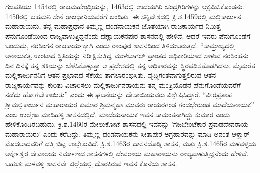 ಗಜಪತಿಯು 1454ರಲ್ಲಿ ರಾಜಮಹೇಂದ್ರಿಯನ್ನು, 1463ರಲ್ಲಿ ಉದಯಗಿರಿ ಚಂದ್ರಗಿರಿಗಳನ್ನು ಆಕ್ರಮಿಸಿಕೊಂಡನು. 1450ರಲ್ಲಿ ಬಹಮನಿ ಸೇನೆ ರಾಜಧಾನಿಯವರೆಗೆ ಬಂದಿತು. ಈ ಸನ್ನಿವೇಶದಲ್ಲಿ ಕ್ರಿ.ಶ.1459ರಲ್ಲಿ ಮಲ್ಲಿಕಾರ್ಜುನ ಮಹಾರಾಯನು, ತನ್ನ ಮಹಾಪ್ರಧಾನ ತಿಮ್ಮಣ್ಣ ದಂಡನಾಯಕನ ಜೊತೆಯಾಗಿ ರಾಜಕಾರ್ಯದ ನಿಮಿತ್ತ ಪೆನುಗೊಂಡೆಯಿಂದ ರಾಜ್ಯವಾಳುತ್ತಿದ್ದನೆಂದು ದಣ್ಣಾಯಕನಪುರ ಶಾಸನದಲ್ಲಿ ಹೇಳಿದೆ. ಆದರೆ ಇವರು ಪೆನುಗೊಂಡೆಗೆ ಬಂದುದು, ನರಸಿಂಗನ ರಾಜಕಾರ್ಯಕ್ಕಾಗಿ ಎಂದು ರಾಂಪುರ ಶಾಸನದಿಂದ ತಿಳಿದುಬರುತ್ತದೆ. “ಸಾಮ್ರಾಜ್ಯದಲ್ಲಿ ಅನಾಯಕತ್ವ ಉಂಟಾದ ಸ್ಥಿತಿಯನ್ನು ನಿರೀಕ್ಷಿಸುತ್ತಿದ್ದ ಮುಳಬಾಗಲ್​ ಪ್ರಾಂತದ ಅಧಿಕಾರಿಯಾದ ಸಾಳುವ ನರಸಿಂಹನು ದಿನ ದಿನಕ್ಕೆ ತನ್ನ ಶಕ್ತಿಯನ್ನು ಬೆಳೆಸಿಕೊಳ್ಳುತ್ತಾ ಆ ಪ್ರದೇಶದಲ್ಲಿ ತನ್ನ ಅಧಿಕಾರವನ್ನು ಸ್ಥಿರಪಡಿಸತೊಡಗಿದನು. ಮೈಮರೆತ ಮಲ್ಲಿಕಾರ್ಜುನನಿಗೆ ಆತನ ಪ್ರಭಾವದ ಸೆಕೆಯು ತಾಗಲಾರಂಭಿಸಿತು. ವೃದ್ಧಿಗಂತವಾಗುತ್ತಲಿರುವ ಆತನ ರಾಜ್ಯಕಾರ್ಯವನ್ನು ಕುರಿತು ವಿಚಾರಿಸಲು ಮಲ್ಲಿಕಾರ್ಜುನರಾಯನು ತನ್ನ ಮಂತ್ರಿಯೊಡನೆ ಪೆನುಗೊಂಡೆಯವರೆಗೆ ನಡೆದು ಹೋಗಬೇಕಾಯಿತು” ಎಂದು ಈ ಘಟನೆಯನ್ನು ದೇಸಾಯಿಯವರು ವಿಶ್ಲೇಷಿಸಿದ್ದಾರೆ. “ವೀರಪ್ರತಾಪ ಶ‍್ರೀಮಲ್ಲಿಕಾರ್ಜುನ ಮಹಾರಾಯರ ಕುಮಾರ ಶ್ರಿಮನ್ಮಹಾ ಮುವರು ರಾಯರಗಂಡ ಗಂಡಭೇರುಂಡ ಮಾದೆಯನಾಯಕ” ಎಂಬ ಉಲ್ಲೇಖ ಮಾದಿಹಳ್ಳಿ ಶಾಸನದಲ್ಲಿದೆ. ಮಾದೆಯನಾಯಕ ಇವನ ಸಾಮಂತ\-ನಾಗಿದ್ದು ಕುಮಾರ ಎಂದು ಹೇಳಿಕೊಂಡಿರಬಹುದು. ಕ್ರಿ.ಶ.1460ರ ಮೇಲುಕೋಟೆ ಶಾಸನದಲ್ಲಿ ಇವನನ್ನು 'ಗಜಬೇಂಟೆಕಾರ ಪ್ರವುಡದೇವರಾಯ ಮಹಾರಾಯರು' ಎಂದು ಕರೆದಿದ್ದು, ತಿಮ್ಮಣ್ಣ ದಂಡನಾಯಕನು ಸೀತಾಪುರ ಅಗ್ರಹಾರವನ್ನು ಮಾಡಿ ಅನಂತ ಆಳ್ವಾರ್​ ಮೊದಲಾದವರಿಗೆ ದತ್ತಿ ಬಿಟ್ಟ ಉಲ್ಲೇಖವಿದೆ. ಕ್ರಿ.ಶ.1463ರ ದಾಸನದೊಡ್ಡಿ ಶಾಸನ, ಮತ್ತು ಕ್ರಿ.ಶ.1465ರ ಮಳವಳ್ಳಿಯ ಅರ್ಕ್ಕೇಶ್ವರ ದೇವಾಲಯ ನಿರ್ಮಾಣದ ಶಾಸನಗಳಲ್ಲಿ ದೇವರಾಯ ಮಹಾರಾಯನು ರಾಜ್ಯವಾಳುತ್ತಿದ್ದನೆಂದು ಹೇಳಿವೆ. ಬಹುಶಃ ಮಳವಳ್ಳಿ ಶಾಸನವೇ ಜಿಲ್ಲೆಯಲ್ಲಿ ದೊರಕಿರುವ ಇವನ ಕೊನೆಯ ಶಾಸನ.

